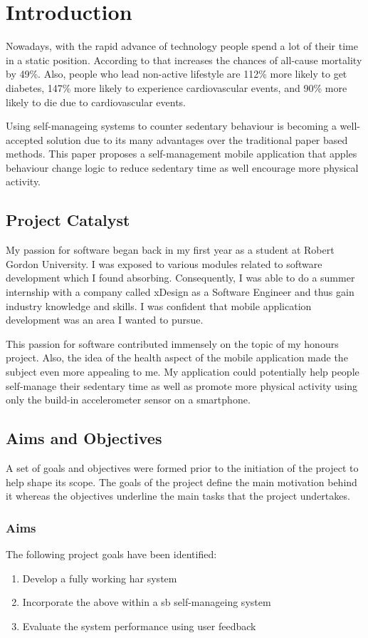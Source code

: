 \chapter{Introduction}
\label{Chapter:Introduction}
Nowadays, with the rapid advance of technology people spend a lot of their time in a static position. According to \citet{wilmot2012} that increases the chances of all-cause mortality by 49\%.  Also, people who lead non-active lifestyle are 112\% more likely to get diabetes, 147\% more likely to experience cardiovascular events, and 90\% more likely to die due to cardiovascular events. 
    
Using self-manageing systems to counter sedentary behaviour is becoming a well-accepted solution due to its many advantages over the traditional paper based methods. This paper proposes a self-management mobile application that apples behaviour change logic to reduce sedentary time as well encourage more physical activity. 
    
    \section{Project Catalyst}
    My passion for software began back in my first year as a student at Robert Gordon University. I was exposed to various modules related to software development which I found absorbing. Consequently, I was able to do a summer internship with a company called xDesign as a Software Engineer and thus gain industry knowledge and skills. I was confident that mobile application development was an area I wanted to pursue. 
    
    This passion for software contributed immensely on the topic of my honours project. Also, the idea of the health aspect of the mobile application made the subject even more appealing to me. My application could potentially help people self-manage their sedentary time as well as promote more physical activity using only the build-in accelerometer sensor on a smartphone. 
    
    
    \section{Aims and Objectives}
    A set of goals and objectives were formed prior to the initiation of the project to help shape its scope. The goals of the project define the main motivation behind it whereas the objectives underline the main tasks that the project undertakes.
    
    \subsection*{Aims}
    The following project goals have been identified: 
    \begin{enumerate}
        \item Develop a fully working \gls{har} system
        \item Incorporate the above within a \gls{sb} self-manageing system
        \item Evaluate the system performance using user feedback
    \end{enumerate}
    
